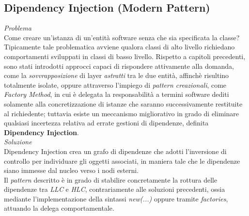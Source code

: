 \documentclass{article}
\begin{document}
\subsection*{Dipendency Injection (Modern Pattern)}
\large
\textit{Problema}\\
Come creare un'istanza di un'entità software senza che sia specificata la classe?\vspace*{14pt}\\
Tipicamente tale problematica avviene qualora classi di alto livello richiedano comportamenti sviluppati in classi di basso livello. Rispetto a capitoli precedenti, sono stati introdotti approcci capaci di rispondere attivamente alla domanda, come la \textit{sovvrapposizione} di layer \textit{astratti} tra le due entità, affinchè risultino totalmente isolate, oppure attraverso l'impiego di \textit{pattern creazionali}, come \textit{Factory Method}, in cui è delegata la responsabilità a termini software dediti solamente alla concretizzazione di istanze che saranno successivamente restituite al richiedente; tuttavia esiste un meccanismo migliorativo in grado di eliminare qualsiasi incertezza relativa ad errate gestioni di dipendenze, definita \textbf{Dipendency Injection}.\vspace*{14pt}\\
\textit{Soluzione}\\
Dipendency Injection crea un grafo di dipendenze che adotti l'inversione di controllo per individuare gli oggetti associati, in maniera tale che le dipendenze siano immesse dal nucleo verso i nodi esterni.\vspace*{14pt}\\
Il \textit{pattern} descritto è in grado di stabilire concretamente la rottura delle dipendenze tra \textit{LLC} e \textit{HLC}, contrariamente alle soluzioni precedenti, ossia mediante l'implementazione della sintassi \textit{new(...)} oppure tramite \textit{factories}, attuando la delega comportamentale.\vspace*{14pt}\\
\end{document}
